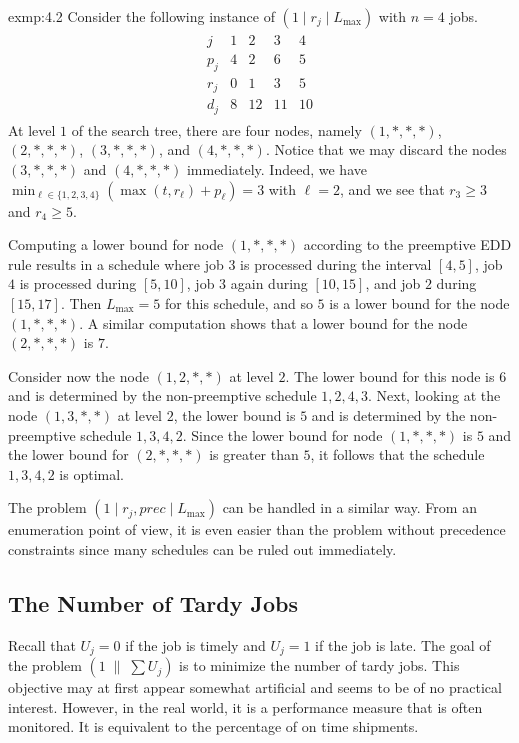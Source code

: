 \begin{exmp}{exmp:4.2}
    Consider the following instance of $(1 \mid r_j \mid L_{\max})$ with 
    $n = 4$ jobs. 
    \begin{align*}
        \begin{array}{c|cccc} 
            j & 1 & 2 & 3 & 4 \\ \hline 
            p_j & 4 & 2 & 6 & 5 \\ 
            r_j & 0 & 1 & 3 & 5 \\ 
            d_j & 8 & 12 & 11 & 10 
        \end{array}
    \end{align*}
    At level $1$ of the search tree, there are four nodes, namely 
    $(1, *, *, *)$, $(2, *, *, *)$, $(3, *, *, *)$, and $(4, *, *, *)$. 
    Notice that we may discard the nodes $(3, *, *, *)$ and 
    $(4, *, *, *)$ immediately. Indeed, we have $\min_{\ell\in \{1, 2, 3, 4\}} 
    (\max(t, r_\ell) + p_\ell) = 3$ with $\ell = 2$, and we see that 
    $r_3 \geq 3$ and $r_4 \geq 5$. 

    Computing a lower bound for node $(1, *, *, *)$ according to the 
    preemptive EDD rule results in a schedule where job $3$ is processed 
    during the interval $[4, 5]$, job $4$ is processed during $[5, 10]$, 
    job $3$ again during $[10, 15]$, and job $2$ during $[15, 17]$. 
    Then $L_{\max} = 5$ for this schedule, and so $5$ is a lower bound 
    for the node $(1, *, *, *)$. A similar computation shows that a lower 
    bound for the node $(2, *, *, *)$ is $7$. 

    Consider now the node $(1, 2, *, *)$ at level $2$. The lower bound 
    for this node is $6$ and is determined by the non-preemptive 
    schedule $1, 2, 4, 3$. Next, looking at the node $(1, 3, *, *)$ 
    at level $2$, the lower bound is $5$ and is determined by the 
    non-preemptive schedule $1, 3, 4, 2$. Since the lower bound for node 
    $(1, *, *, *)$ is $5$ and the lower bound for $(2, *, *, *)$ is 
    greater than $5$, it follows that the schedule $1, 3, 4, 2$ is optimal. 
\end{exmp}

The problem $(1 \mid r_j, prec \mid L_{\max})$ can be handled in a similar 
way. From an enumeration point of view, it is even easier than the problem 
without precedence constraints since many schedules can be ruled out 
immediately. 

\subsection{The Number of Tardy Jobs} \label{subsec:4.2}
Recall that $U_j = 0$ if the job is timely and $U_j = 1$ if the job is late. 
The goal of the problem $(1\;\|\;\sum U_j)$ is to minimize the number of 
tardy jobs. This objective may at first appear somewhat artificial and 
seems to be of no practical interest. However, in the real world, it is a 
performance measure that is often monitored. It is equivalent to the 
percentage of on time shipments.

